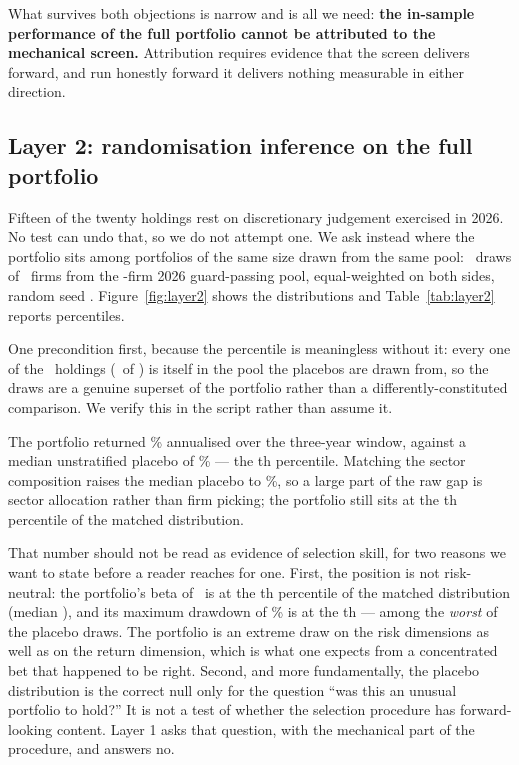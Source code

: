 \documentclass[a4paper,11pt]{article}
\begin{document}
What survives both objections is narrow and is all we need: \textbf{the in-sample performance of the
full portfolio cannot be attributed to the mechanical screen.} Attribution requires evidence that the
screen delivers forward, and run honestly forward it delivers nothing measurable in either
direction.




\subsection{Layer 2: randomisation inference on the full portfolio}\label{sec:layer2}

Fifteen of the twenty holdings rest on discretionary judgement exercised in 2026. No test can undo
that, so we do not attempt one. We ask instead where the portfolio sits among portfolios of the same size
drawn from the same pool: \LtwoDraws\ draws of \LtwoActualHoldings\ firms from the \LtwoPool-firm
2026 guard-passing pool, equal-weighted on both sides, random seed \LtwoSeed. Figure~\ref{fig:layer2} shows the distributions and Table~\ref{tab:layer2}
reports percentiles.

One precondition first, because the percentile is meaningless without it: every one of the
\LtwoActualHoldings\ holdings (\LtwoInsidePool\ of \LtwoActualHoldings) is itself in the pool the
placebos are drawn from, so the draws are a genuine superset of the portfolio rather than a differently-constituted
comparison. We verify this in the script rather than assume it.

The portfolio returned \LtwoActualAnn\% annualised over the three-year window, against a median
unstratified placebo of \LtwoUnstratMedian\% --- the \LtwoUnstratPctile th percentile. Matching the
sector composition raises the median placebo to \LtwoMatchedMedian\%, so a large part of the raw gap
is sector allocation rather than firm picking; the portfolio still sits at the
\LtwoMatchedPctile th percentile of the matched distribution.

That number should not be read as evidence of selection skill, for two reasons we want to state
before a reader reaches for one. First, the position is not risk-neutral: the portfolio's beta of
\LtwoActualBeta\ is at the \LtwoMatchedBetaPctile th percentile of the matched distribution
(median \LtwoMatchedBetaMedian), and its maximum drawdown of \LtwoActualMdd\% is at the
\LtwoMatchedMddPctile th --- among the \emph{worst} of the placebo draws. The portfolio is an
extreme draw on the risk dimensions as well as on the return dimension, which is what one expects
from a concentrated bet that happened to be right. Second, and more fundamentally, the placebo
distribution is the correct null only for the question ``was this an unusual portfolio to hold?''
It is not a test of whether the selection procedure has forward-looking content. Layer 1 asks that
question, with the mechanical part of the procedure, and answers no.
\end{document}
